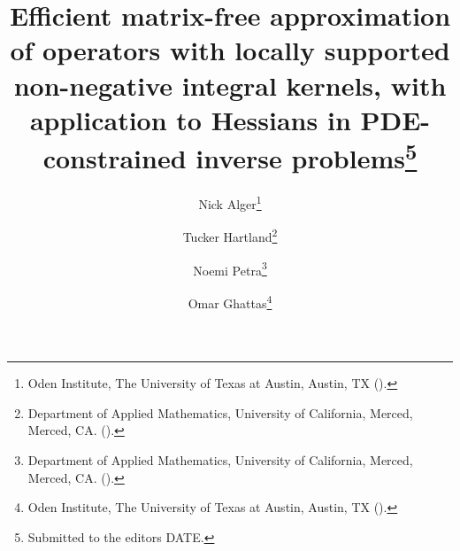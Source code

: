 

\usepackage{lipsum}
\usepackage{amsfonts}
\usepackage{graphicx}
\usepackage{epstopdf}
\usepackage{amsmath}
\usepackage{subcaption}
\usepackage{pgfplots}

\usepackage[algo2e, ruled, noend, linesnumbered]{algorithm2e}
\usepackage{bm}
\ifpdf
\else
\fi

\usepackage{placeins}
\usepackage{multirow}

\newcommand{\creflastconjunction}{, and~}
\newcommand{\nor}[1]{\left\|#1\right\|}



\newcommand{\norm}[1]{\|#1\|}



\title{Efficient matrix-free approximation of operators with locally supported non-negative integral kernels, with application to Hessians in PDE-constrained inverse problems\thanks{Submitted to the editors DATE.
}}

\author{Nick Alger\thanks{Oden Institute, The University of Texas at Austin, Austin, TX 
  ().}
\and Tucker Hartland\thanks{Department of Applied Mathematics, University of California, Merced, Merced, CA. 
	().}
\and Noemi Petra\thanks{Department of Applied Mathematics, University of California, Merced, Merced, CA. 
  ().}
\and Omar Ghattas\thanks{Oden Institute, The University of Texas at Austin, Austin, TX 
	().}}

